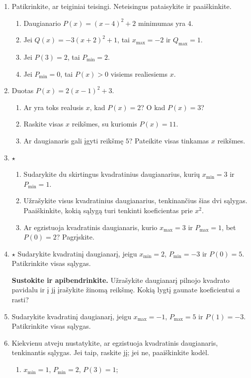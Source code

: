 \documentclass[12pt,a4paper]{article}
\begin{document}
\begin{enumerate}
\item Patikrinkite, ar teiginiai teisingi. Neteisingus pataisykite ir paaiškinkite.
\begin{enumerate}
\item Daugianario $P(x)=(x-4)^2+2$ minimumas yra $4$.
\item Jei $Q(x)=-3(x+2)^2+1$, tai $x_{\max}=-2$ ir $Q_{\max}=1$.
\item Jei $P(3)=2$, tai $P_{\min}=2$.
\item Jei $P_{\min}=0$, tai $P(x)>0$ visiems realiesiems $x$.
\end{enumerate}
\item Duotas $P(x)=2(x-1)^2+3$.
\begin{enumerate}
\item Ar yra toks realusis $x$, kad $P(x)=2$? O kad $P(x)=3$?
\item Raskite visas $x$ reikšmes, su kuriomis $P(x)=11$.
\item Ar daugianaris gali įgyti reikšmę $5$? Pateikite visas tinkamas $x$ reikšmes.
\end{enumerate}
\item $\star$ \begin{enumerate}
\item Sudarykite du skirtingus kvadratinius daugianarius, kurių $x_{\min}=3$ ir $P_{\min}=1$.
\item Užrašykite visus kvadratinius daugianarius, tenkinančius šias dvi sąlygas. Paaiškinkite, kokią sąlygą turi tenkinti koeficientas prie $x^2$.
\item Ar egzistuoja kvadratinis daugianaris, kurio $x_{\max}=3$ ir $P_{\max}=1$, bet $P(0)=2$? Pagrįskite.
\end{enumerate}
\item $\star$ Sudarykite kvadratinį daugianarį, jeigu $x_{\min}=2$, $P_{\min}=-3$ ir $P(0)=5$. Patikrinkite visas sąlygas.
\par\medskip
\textbf{Sustokite ir apibendrinkite.} Užrašykite daugianarį pilnojo kvadrato pavidalu ir į jį įrašykite žinomą reikšmę. Kokią lygtį gaunate koeficientui $a$ rasti?
\item Sudarykite kvadratinį daugianarį, jeigu $x_{\max}=-1$, $P_{\max}=5$ ir $P(1)=-3$. Patikrinkite visas sąlygas.
\item Kiekvienu atveju nustatykite, ar egzistuoja kvadratinis daugianaris, tenkinantis sąlygas. Jei taip, raskite jį; jei ne, paaiškinkite kodėl.
\begin{enumerate}
\item $x_{\min}=1$, $P_{\min}=2$, $P(3)=1$;

\end{enumerate}
\end{enumerate}
\end{document}

